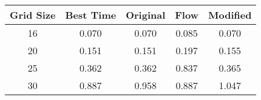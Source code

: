 \begin{tabular}{|c|c|c|c|c|}
\hline
Grid Size & Best Time & Original & Flow & Modified \\
\hline
16 & 0.070 & 0.070 & 0.085 & 0.070 \\
20 & 0.151 & 0.151 & 0.197 & 0.155 \\
25 & 0.362 & 0.362 & 0.837 & 0.365 \\
30 & 0.887 & 0.958 & 0.887 & 1.047 \\
\hline
\end{tabular}